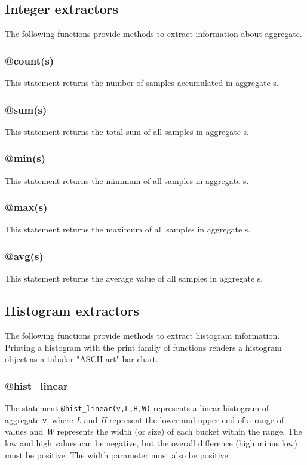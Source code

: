 \documentclass[twoside,english]{article}
\begin{document}
\subsection{Integer extractors}

The following functions provide methods to extract information about aggregate.


\subsubsection{@count(s)}
This statement returns the number of samples accumulated in aggregate s.


\subsubsection{@sum(s)}
This statement returns the total sum of all samples in aggregate s.


\subsubsection{@min(s)}
This statement returns the minimum of all samples in aggregate s.


\subsubsection{@max(s)}
This statement returns the maximum of all samples in aggregate s.


\subsubsection{@avg(s)}
This statement returns the average value of all samples in aggregate s.


\subsection{Histogram extractors}
The following functions provide methods to extract histogram information.
Printing a histogram with the print family of functions renders a histogram
object as a tabular "ASCII art" bar chart.

\subsubsection{@hist\_linear}
The statement \texttt{@hist\_linear(v,L,H,W)} represents a linear histogram
of aggregate \texttt{v},
where \emph{L} and \emph{H} represent the lower and upper end of
a range of values and \emph{W} represents the width (or size) of each bucket
within the range.  The low and high values can be negative, but the overall
difference (high minus low) must be positive. The width parameter must also
be positive.
\end{document}
